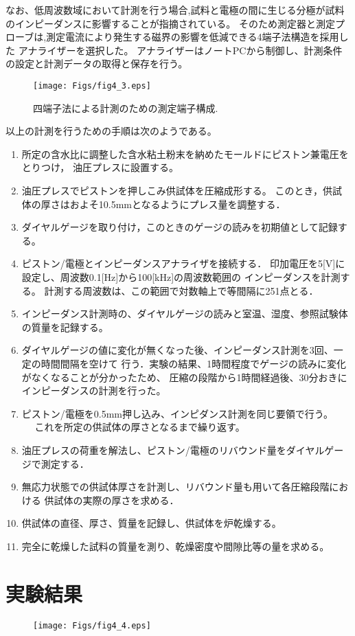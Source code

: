 なお、低周波数域において計測を行う場合,試料と電極の間に生じる分極が試料のインピーダンスに影響することが指摘されている。
そのため測定器と測定プローブは,測定電流により発生する磁界の影響を低減できる4端子法構造を採用した
アナライザーを選択した。
アナライザーはノートPCから制御し、計測条件の設定と計測データの取得と保存を行う。
\begin{figure}[h]
	\begin{center}
	\texttt{[image: Figs/fig4\_3.eps]} 
	\end{center}
	\caption{
		四端子法による計測のための測定端子構成.
	} 
	\label{fig:fig4_3}
\end{figure}
以上の計測を行うための手順は次のようである。
\begin{enumerate}
\item
	所定の含水比に調整した含水粘土粉末を納めたモールドにピストン兼電圧をとりつけ，
	油圧プレスに設置する。
\item
	油圧プレスでピストンを押しこみ供試体を圧縮成形する。
	このとき，供試体の厚さはおよそ10.5mmとなるようにプレス量を調整する．
\item
	ダイヤルゲージを取り付け，このときのゲージの読みを初期値として記録する。
\item
	ピストン/電極とインピーダンスアナライザを接続する．
	印加電圧を5[V]に設定し、周波数0.1[Hz]から100[kHz]の周波数範囲の
	インピーダンスを計測する。
	計測する周波数は、この範囲で対数軸上で等間隔に251点とる．
\item
	インピーダンス計測時の、ダイヤルゲージの読みと室温、湿度、参照試験体の質量を記録する。
\item
	ダイヤルゲージの値に変化が無くなった後、インピーダンス計測を3回、一定の時間間隔を空けて
	行う．実験の結果、1時間程度でゲージの読みに変化がなくなることが分かったため、
	圧縮の段階から1時間経過後、30分おきにインピーダンスの計測を行った。
\item
	ピストン/電極を0.5mm押し込み、インピダンス計測を同じ要領で行う。
　	これを所定の供試体の厚さとなるまで繰り返す。
\item
	油圧プレスの荷重を解法し、ピストン/電極のリバウンド量をダイヤルゲージで測定する．
\item
	無応力状態での供試体厚さを計測し、リバウンド量も用いて各圧縮段階における
	供試体の実際の厚さを求める．
\item
	供試体の直径、厚さ、質量を記録し、供試体を炉乾燥する。
\item
	完全に乾燥した試料の質量を測り、乾燥密度や間隙比等の量を求める。		
\end{enumerate}\section{実験結果}
\begin{figure}[h]
	\begin{center}
	\texttt{[image: Figs/fig4\_4.eps]} 
	\end{center}
	\caption{
	} 
	\label{fig:fig4_4}
\end{figure}
